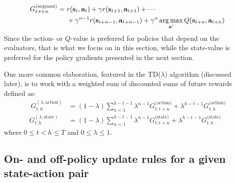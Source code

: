 \documentclass{article}
\DeclareMathOperator*{\argmax}{arg\,max}
\begin{document}
\begin{equation}
\begin{split}
G_{t:t+n}^{(\text{argmax})}&=r(\mathbf{s}_t,\mathbf{a}_t)+\gamma r(\mathbf{s}_{t+1},\mathbf{a}_{t+1})+\cdots\\&\nobreakspace\nobreakspace\nobreakspace\nobreakspace+\gamma^{n-1}r(\mathbf{s}_{t+n-1},\mathbf{a}_{t+n-1})+\gamma^n \argmax_{\mathbf{a}'}Q (\mathbf{s}_{t+n},\mathbf{a}_{t+n})\\\end{split}\end{equation}Since the action- or $Q$-value is preferred for policies that depend on the evaluators, that is what we focus on in this section, while the state-value is preferred for the policy gradients presented in the next section.

One more common elaboration, featured in the TD($\lambda$) algorithm (discussed later), is to work with a weighted sum of discounted sums of future rewards defined as:
\begin{equation}\begin{split}\
G_{t:h}^{(\lambda,\text{action})} &=(1-\lambda)\sum_{n=1}^{h-t-1}\lambda^{n-1}G_{t:t+n}^\text{(action)}+\lambda^{h-t-1}G_{t:h}^\text{(action)} \\G_{t:h}^{(\lambda,\text{state})} &=(1-\lambda)\sum_{n=1}^{h-t-1}\lambda^{n-1}G_{t:t+n}^\text{(state)}+\lambda^{h-t-1}G_{t:h}^\text{(state)} 
\end{split}\end{equation} where $0\leq t<h\leq T$ and $0\leq \lambda \leq 1$.

\subsection{On- and off-policy update rules for a given state-action pair}
\end{document}
